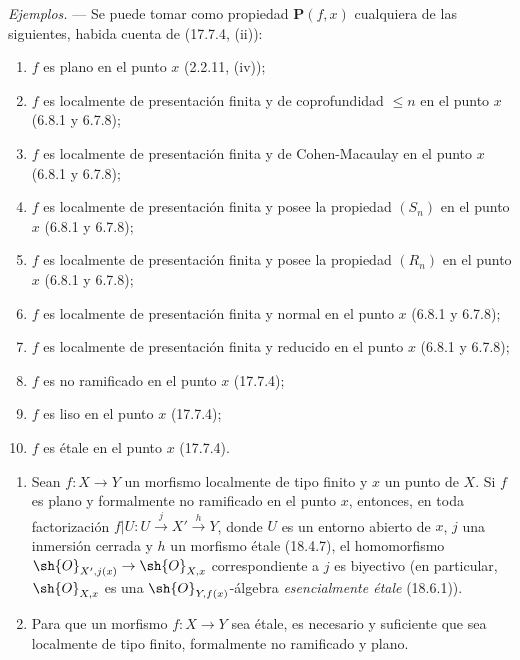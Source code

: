 \begin{env}[18.4.11]
\label{IV.18.4.11}
\emph{Ejemplos.} --- Se puede tomar como propiedad $\boldsymbol{P}(f,x)$ cualquiera de las siguientes, habida cuenta de (17.7.4, (ii)):
\begin{enumerate}
  \item[(i)] $f$ es plano en el punto $x$ (2.2.11, (iv));
  \item[(ii)] $f$ es localmente de presentación finita y de coprofundidad $\leq n$ en el punto $x$ (6.8.1 y 6.7.8);
  \item[(iii)] $f$ es localmente de presentación finita y de Cohen-Macaulay en el punto $x$ (6.8.1 y 6.7.8);
  \item[(iv)] $f$ es localmente de presentación finita y posee la propiedad $(S_n)$ en el punto $x$ (6.8.1 y 6.7.8);
  \item[(v)] $f$ es localmente de presentación finita y posee la propiedad $(R_n)$ en el punto $x$ (6.8.1 y 6.7.8);
  \item[(vi)] $f$ es localmente de presentación finita y normal en el punto $x$ (6.8.1 y 6.7.8);
  \item[(vii)] $f$ es localmente de presentación finita y reducido en el punto $x$ (6.8.1 y 6.7.8);
  \item[(viii)] $f$ es no ramificado en el punto $x$ (17.7.4);
  \item[(ix)] $f$ es liso en el punto $x$ (17.7.4);
  \item[(x)] $f$ es étale en el punto $x$ (17.7.4).
\end{enumerate}
\end{env}


\begin{corollary}[18.4.12]
\label{IV.18.4.12}
\begin{enumerate}
  \item[\textup{(i)}] Sean $f:X\to Y$ un morfismo localmente de tipo finito y $x$ un punto de $X$. Si $f$ es plano y formalmente no ramificado en el punto $x$, entonces, en toda factorización $f|U:U\xrightarrow{j}X'\xrightarrow{h}Y$, donde $U$ es un entorno abierto de $x$, $j$ una inmersión cerrada y $h$ un morfismo étale \textup{(18.4.7)}, el homomorfismo $\sh{O}_{X',j(x)}\to\sh{O}_{X,x}$ correspondiente a $j$ es biyectivo \textup{(en particular, $\sh{O}_{X,x}$ es una $\sh{O}_{Y,f(x)}$-álgebra \emph{esencialmente étale} (18.6.1))}.
  \item[\textup{(ii)}] Para que un morfismo $f:X\to Y$ sea étale, es necesario y suficiente que sea localmente de tipo finito, formalmente no ramificado y plano.
\end{enumerate}
\end{corollary}

